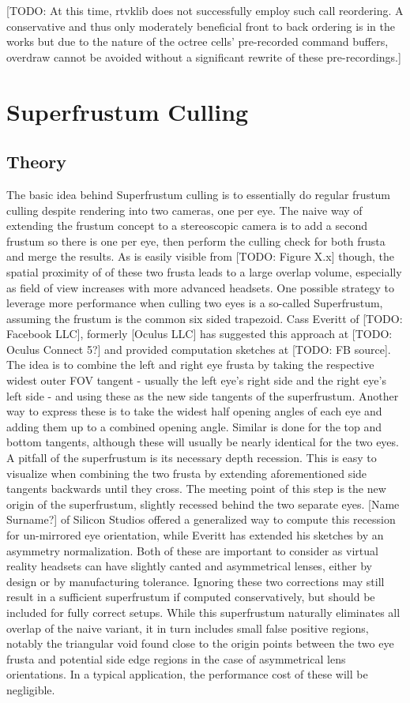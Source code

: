 [TODO: At this time, rtvklib does not successfully employ such call reordering. A conservative and thus only moderately beneficial front to back ordering is in the works but due to the nature of the octree cells' pre-recorded command buffers, overdraw cannot be avoided without a significant rewrite of these pre-recordings.]

\section{Superfrustum Culling}
\subsection{Theory}
The basic idea behind Superfrustum culling is to essentially do regular frustum culling despite rendering into two cameras, one per eye. The naive way of extending the frustum concept to a stereoscopic camera is to add a second frustum so there is one per eye, then perform the culling check for both frusta and merge the results. 
As is easily visible from [TODO: Figure X.x] though, the spatial proximity of of these two frusta leads to a large overlap volume, especially as field of view increases with more advanced headsets. One possible strategy to leverage more performance when culling two eyes is a so-called Superfrustum, assuming the frustum is the common six sided trapezoid. Cass Everitt of [TODO: Facebook LLC], formerly [Oculus LLC] has suggested this approach at [TODO: Oculus Connect 5?] and provided computation sketches at [TODO: FB source]. The idea is to combine the left and right eye frusta by taking the respective widest outer FOV tangent - usually the left eye's right side and the right eye's left side - and using these as the new side tangents of the superfrustum. Another way to express these is to take the widest half opening angles of each eye and adding them up to a combined opening angle. Similar is done for the top and bottom tangents, although these will usually be nearly identical for the two eyes. 
A pitfall of the superfrustum is its necessary depth recession. This is easy to visualize when combining the two frusta by extending aforementioned side tangents backwards until they cross. The meeting point of this step is the new origin of the superfrustum, slightly recessed behind the two separate eyes. 
[Name Surname?] of Silicon Studios offered a generalized way to compute this recession for un-mirrored eye orientation, while Everitt has extended his sketches by an asymmetry normalization. Both of these are important to consider as virtual reality headsets can have slightly canted and asymmetrical lenses, either by design or by manufacturing tolerance. Ignoring these two corrections may still result in a sufficient superfrustum if computed conservatively, but should be included for fully correct setups. 
While this superfrustum naturally eliminates all overlap of the naive variant, it in turn includes small false positive regions, notably the triangular void found close to the origin points between the two eye frusta and potential side edge regions in the case of asymmetrical lens orientations. In a typical application, the performance cost of these will be negligible. \\

